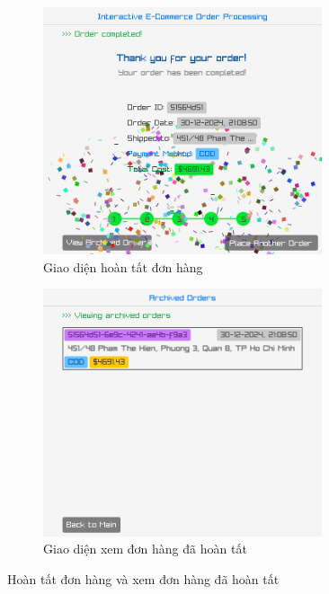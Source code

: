 \documentclass[a4paper,12pt]{report}
\begin{document}
\begin{figure}[!ht]
  \centering
  \begin{subfigure}{0.46\textwidth}
    \centering
    \includegraphics[width=0.9\textwidth]{../assets/screenshots/gui/order_complete.png}
    \caption{Giao diện hoàn tất đơn hàng}
  \end{subfigure}
  \hfill
  \begin{subfigure}{0.46\textwidth}
    \centering
    \includegraphics[width=0.9\textwidth]{../assets/screenshots/gui/archived_order.png}
    \caption{Giao diện xem đơn hàng đã hoàn tất}
  \end{subfigure}
  \caption{Hoàn tất đơn hàng và xem đơn hàng đã hoàn tất}
\end{figure}
\end{document}
